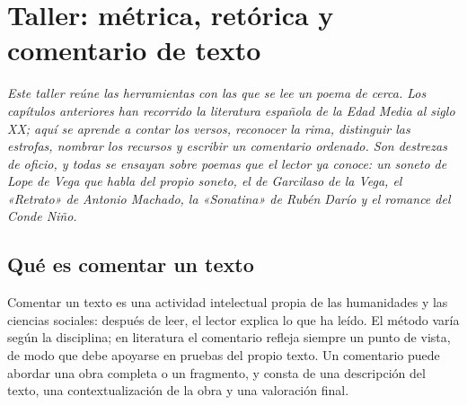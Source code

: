 \documentclass{book}
\begin{document}
\chapter{Taller: métrica, retórica y comentario de texto}
\label{chap:lit-13}

\noindent\textit{Este taller reúne las herramientas con las que se lee un poema de cerca. Los capítulos anteriores han recorrido la literatura española de la Edad Media al siglo XX; aquí se aprende a contar los versos, reconocer la rima, distinguir las estrofas, nombrar los recursos y escribir un comentario ordenado. Son destrezas de oficio, y todas se ensayan sobre poemas que el lector ya conoce: un soneto de Lope de Vega que habla del propio soneto, el de Garcilaso de la Vega, el «Retrato» de Antonio Machado, la «Sonatina» de Rubén Darío y el romance del Conde Niño.}


\section{Qué es comentar un texto}

Comentar un texto es una actividad intelectual propia de las humanidades y las ciencias sociales: después de leer, el lector explica lo que ha leído. El método varía según la disciplina; en literatura el comentario refleja siempre un punto de vista, de modo que debe apoyarse en pruebas del propio texto. Un comentario puede abordar una obra completa o un fragmento, y consta de una descripción del texto, una contextualización de la obra y una valoración final.

\end{document}
